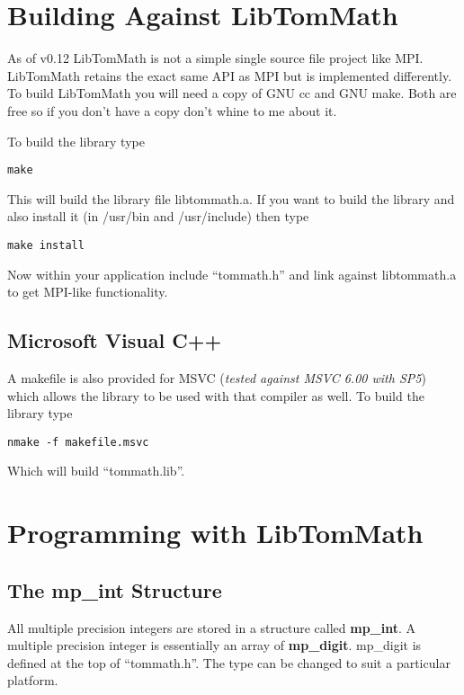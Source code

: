 \documentclass{article}
\begin{document}
\section{Building Against LibTomMath}

As of v0.12 LibTomMath is not a simple single source file project like MPI.  LibTomMath retains the exact same API as MPI
but is implemented differently.  To build LibTomMath you will need a copy of GNU cc and GNU make.  Both are free so if you 
don't have a copy don't whine to me about it.

To build the library type 

\begin{verbatim}
make
\end{verbatim}

This will build the library file libtommath.a.  If you want to build the library and also install it (in /usr/bin and /usr/include) then
type 

\begin{verbatim}
make install
\end{verbatim}

Now within your application include ``tommath.h'' and link against libtommath.a to get MPI-like functionality.

\subsection{Microsoft Visual C++}
A makefile is also provided for MSVC (\textit{tested against MSVC 6.00 with SP5}) which allows the library to be used
with that compiler as well.  To build the library type

\begin{verbatim}
nmake -f makefile.msvc
\end{verbatim}

Which will build ``tommath.lib''.  

\section{Programming with LibTomMath}

\subsection{The mp\_int Structure}
All multiple precision integers are stored in a structure called \textbf{mp\_int}.  A multiple precision integer is
essentially an array of \textbf{mp\_digit}.  mp\_digit is defined at the top of ``tommath.h''.  The type can be changed 
to suit a particular platform.  
\end{document}
